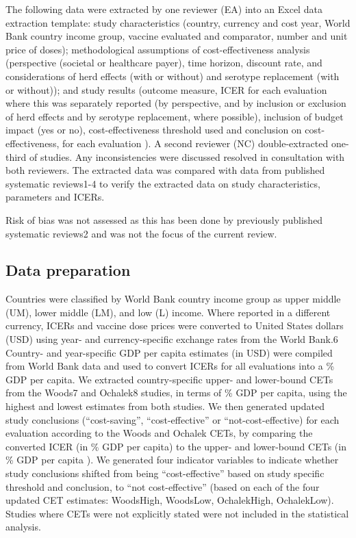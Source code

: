 \documentclass[12pt]{article}
\begin{document}
The following data were extracted by one reviewer (EA) into an Excel data extraction template: study characteristics (country, currency and cost year, World Bank country income group, vaccine evaluated and comparator, number and unit price of doses); methodological assumptions of cost-effectiveness analysis (perspective (societal or healthcare payer), time horizon, discount rate, and considerations of herd effects (with or without) and serotype replacement (with or without)); and study results (outcome measure, ICER for each evaluation where this was separately reported (by perspective, and by inclusion or exclusion of herd effects and by serotype replacement, where possible), inclusion of budget impact (yes or no), cost-effectiveness threshold used and conclusion on cost-effectiveness, for each evaluation ). A second reviewer (NC) double-extracted one-third of studies. Any inconsistencies were discussed resolved in consultation with both reviewers. The extracted data was compared with data from published systematic reviews1-4 to verify the extracted data on study characteristics, parameters and ICERs. 

Risk of bias was not assessed as this has been done by previously published systematic reviews2 and was not the focus of the current review.

\subsection*{Data preparation}
Countries were classified by World Bank country income group as upper middle (UM), lower middle (LM), and low (L) income. Where reported in a different currency, ICERs and vaccine dose prices were converted to United States dollars (USD) using year- and currency-specific exchange rates from the World Bank.6 Country- and year-specific GDP per capita estimates (in USD) were compiled from World Bank data and used to convert ICERs for all evaluations into a \% GDP per capita. We extracted country-specific upper- and lower-bound CETs from the Woods7 and Ochalek8 studies, in terms of \% GDP per capita, using the highest and lowest estimates from both studies. We then generated updated study conclusions (“cost-saving”, “cost-effective” or “not-cost-effective) for each evaluation according to the Woods and Ochalek CETs, by comparing the converted ICER (in \% GDP per capita) to the upper- and lower-bound CETs (in \% GDP per capita ). We generated four indicator variables to indicate whether study conclusions shifted from being “cost-effective” based on study specific threshold and conclusion, to “not cost-effective” (based on each of the four updated CET estimates: WoodsHigh, WoodsLow, OchalekHigh, OchalekLow). Studies where CETs were not explicitly stated were not included in the statistical analysis.
\end{document}
